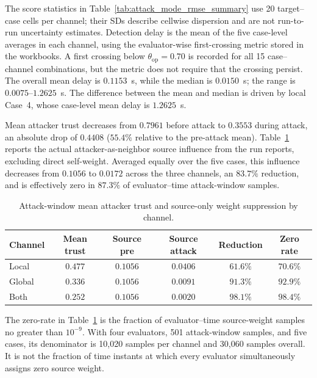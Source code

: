 The score statistics in Table~\ref{tab:attack_mode_rmse_summary} use 20 target--case cells per channel; their SDs describe cellwise dispersion and are not run-to-run uncertainty estimates. Detection delay is the mean of the five case-level averages in each channel, using the evaluator-wise first-crossing metric stored in the workbooks. A first crossing below $\theta_{\mathrm{op}}=0.70$ is recorded for all 15 case--channel combinations, but the metric does not require that the crossing persist. The overall mean delay is $0.1153$~s, while the median is $0.0150$~s; the range is $0.0075$--$1.2625$~s. The difference between the mean and median is driven by local Case~4, whose case-level mean delay is $1.2625$~s.

Mean attacker trust decreases from $0.7961$ before attack to $0.3553$ during attack, an absolute drop of $0.4408$ ($55.4\%$ relative to the pre-attack mean). Table~\ref{tab:source_suppression_by_channel} reports the actual attacker-as-neighbor source influence from the run reports, excluding direct self-weight. Averaged equally over the five cases, this influence decreases from $0.1056$ to $0.0172$ across the three channels, an $83.7\%$ reduction, and is effectively zero in $87.3\%$ of evaluator--time attack-window samples.

\begin{table}[!t]
\centering
\caption{Attack-window mean attacker trust and source-only weight suppression by channel.}
\label{tab:source_suppression_by_channel}
\scriptsize
\setlength{\tabcolsep}{3pt}
\begin{tabular}{lccccc}
\toprule
\textbf{Channel} & \textbf{Mean trust} & \textbf{Source pre} & \textbf{Source attack} & \textbf{Reduction} & \textbf{Zero rate} \\
\midrule
Local  & $0.477$ & $0.1056$ & $0.0406$ & $61.6\%$ & $70.6\%$ \\
Global & $0.336$ & $0.1056$ & $0.0091$ & $91.3\%$ & $92.9\%$ \\
Both   & $0.252$ & $0.1056$ & $0.0020$ & $98.1\%$ & $98.4\%$ \\
\bottomrule
\end{tabular}
\end{table}

The zero-rate in Table~\ref{tab:source_suppression_by_channel} is the fraction of evaluator--time source-weight samples no greater than $10^{-9}$. With four evaluators, 501 attack-window samples, and five cases, its denominator is 10,020 samples per channel and 30,060 samples overall. It is not the fraction of time instants at which every evaluator simultaneously assigns zero source weight.

